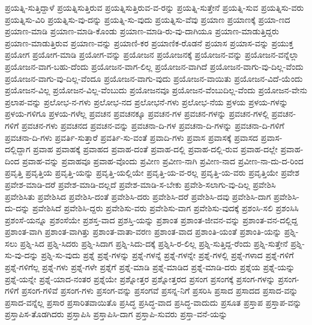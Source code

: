 {ಪ್ರಯತ್ನಿ-ಸುತ್ತಿದ್ದಾಳೆ
ಪ್ರಯತ್ನಿಸುತ್ತಿರುವ
ಪ್ರಯತ್ನಿಸುತ್ತಿರುವ-ವ-ರನ್ನು
ಪ್ರಯತ್ನಿ-ಸುತ್ತೇನೆ
ಪ್ರಯತ್ನಿ-ಸುವ
ಪ್ರಯತ್ನಿಸು-ವರು
ಪ್ರಯತ್ನಿಸು-ವಿರಿ
ಪ್ರಯತ್ನಿಸು-ವು-ದನ್ನು
ಪ್ರಯತ್ನಿ-ಸು-ವುದು
ಪ್ರಯತ್ನಿಸು-ವೆವು
ಪ್ರಯಾಣ
ಪ್ರಯಾಣಕ್ಕೆ
ಪ್ರಯಾ-ಣದ
ಪ್ರಯಾಣ-ಮಾಡಿ
ಪ್ರಯಾಣ-ಮಾಡಿ-ಕೊಂಡು
ಪ್ರಯಾಣ-ಮಾಡಿ-ರು-ವು-ದಾಗಿಯೂ
ಪ್ರಯಾಣ-ಮಾಡುತ್ತಿದ್ದರು
ಪ್ರಯಾಣ-ಮಾಡುತ್ತಿರುವ
ಪ್ರಯಾಣ-ವನ್ನು
ಪ್ರಯಾಣಿ-ಕರ
ಪ್ರಯಾಣಿಕ-ರೊಡನೆ
ಪ್ರಯಾಸ
ಪ್ರಯಾಸ-ವನ್ನು
ಪ್ರಯುಕ್ತ
ಪ್ರಯೋಗ
ಪ್ರಯೋಗ-ಮಾಡಿ
ಪ್ರಯೋಗ-ವನ್ನು
ಪ್ರಯೋಜನ
ಪ್ರಯೋಜನಕ್ಕೆ
ಪ್ರಯೋಜನ-ವನ್ನು
ಪ್ರಯೋಜನ-ವನ್ನೆಲ್ಲಾ
ಪ್ರಯೋಜನ-ವಾಗ-ಬಹು-ದೆಂದು
ಪ್ರಯೋಜನ-ವಾಗ-ಲಿಲ್ಲ
ಪ್ರಯೋಜನ-ವಾಗಿದೆ
ಪ್ರಯೋಜನ-ವಾಗು-ವು-ದಿಲ್ಲ-ವೆಂದು
ಪ್ರಯೋಜನ-ವಾಗು-ವು-ದಿಲ್ಲ-ವೆಂದೂ
ಪ್ರಯೋಜನ-ವಾಗು-ವುದು
ಪ್ರಯೋಜನ-ವಾಯಿತು
ಪ್ರಯೋಜನ-ವಿದೆ-ಯೆಂದು
ಪ್ರಯೋಜನ-ವಿಲ್ಲ
ಪ್ರಯೋಜನ-ವಿಲ್ಲ-ವೆಂಬುದು
ಪ್ರಯೋಜನವೂ
ಪ್ರಯೋಜನ-ವೆಂಬುದಿಲ್ಲ-ವೆಂದು
ಪ್ರಯೋಜನ-ವೇನು
ಪ್ರಲಾಪ-ವನ್ನು
ಪ್ರಲೋಭ-ನ-ಗಳು
ಪ್ರಲೋಭ-ನದ
ಪ್ರಲೋಭನೆ-ಗಳು
ಪ್ರಲೋಭ-ನೆಯ
ಪ್ರಳಯ
ಪ್ರಳಯ-ಗಳನ್ನು
ಪ್ರಳಯ-ಗಳಿಗೂ
ಪ್ರಳಯ-ಗಳೆಲ್ಲ
ಪ್ರವಚನ
ಪ್ರವಚನಕ್ಕೂ
ಪ್ರವಚನ-ಗಳ
ಪ್ರವಚನ-ಗಳನ್ನು
ಪ್ರವಚನ-ಗಳಲ್ಲಿ
ಪ್ರವಚನ-ಗಳಿಗೆ
ಪ್ರವಚನ-ಗಳು
ಪ್ರವಚನದ
ಪ್ರವಚನ-ವನ್ನು
ಪ್ರವಚನಾ-ದಿ-ಗಳ
ಪ್ರವಚನಾ-ದಿ-ಗಳನ್ನು
ಪ್ರವಚನಾ-ದಿ-ಗಳಿಗೆ
ಪ್ರವಚನಾ-ದಿ-ಗಳು
ಪ್ರವರ್ತಿ-ಸುತ್ತಾರೆ
ಪ್ರವರ್ತಿ-ಸು-ವಂತೆ
ಪ್ರವಾದಿ-ಗಳು
ಪ್ರವಾಸ
ಪ್ರವಾಸಕ್ಕೆ
ಪ್ರವಾಸದ
ಪ್ರವಾಸ-ದಲ್ಲಿದ್ದಾಗ
ಪ್ರವಾಹ
ಪ್ರವಾಹಕ್ಕೆ
ಪ್ರವಾಹದ
ಪ್ರವಾಹ-ದಂತೆ
ಪ್ರವಾಹ-ದಲ್ಲಿ
ಪ್ರವಾಹ-ದಲ್ಲಿ-ರುವ
ಪ್ರವಾಹ-ದಲ್ಲೇ
ಪ್ರವಾಹ-ದಿಂದ
ಪ್ರವಾಹ-ವನ್ನು
ಪ್ರವಾಹವೂ
ಪ್ರವಾಹ-ವೊಂದು
ಪ್ರವೀಣ
ಪ್ರವೀಣ-ನಾಗಿ
ಪ್ರವೀಣ-ನಾದ
ಪ್ರವೀಣ-ನಾ-ದು-ದ-ರಿಂದ
ಪ್ರವೃತ್ತಿ
ಪ್ರವೃತ್ತಿಯ
ಪ್ರವೃತ್ತಿ-ಯನ್ನು
ಪ್ರವೃತ್ತಿ-ಯಲ್ಲಿಯೇ
ಪ್ರವೃತ್ತಿ-ಯ-ವ-ರಲ್ಲ
ಪ್ರವೃತ್ತಿ-ಯ-ವರು
ಪ್ರವೃತ್ತಿಯೇ
ಪ್ರವೇಶ
ಪ್ರವೇಶ-ಮಾಡಿ-ದರೆ
ಪ್ರವೇಶ-ಮಾಡಿ-ದಲ್ಲದೆ
ಪ್ರವೇಶ-ಮಾಡಿ-ಸ-ಬೇಕು
ಪ್ರವೇಶಿ-ಸಲಾಗು-ವು-ದಿಲ್ಲ
ಪ್ರವೇಶಿಸಿ
ಪ್ರವೇಶಿಸಿತು
ಪ್ರವೇಶಿಸಿದ
ಪ್ರವೇಶಿಸಿ-ದಂತೆ
ಪ್ರವೇಶಿಸಿ-ದರು
ಪ್ರವೇಶಿಸಿ-ದರೆ
ಪ್ರವೇಶಿಸಿ-ದವು
ಪ್ರವೇಶಿಸಿ-ದಾಗ
ಪ್ರವೇಶಿಸಿ-ದು-ದನ್ನು
ಪ್ರವೇಶಿಸಿದೆ
ಪ್ರವೇಶಿಸಿ-ದ್ದರು
ಪ್ರವೇಶಿಸು-ವರು
ಪ್ರವೇಶಿಸು-ವಾಗ
ಪ್ರವೇಶಿಸು-ವುದಕ್ಕೆ
ಪ್ರಶಂಸಿ-ಸಲಿ
ಪ್ರಶಂಸಿಸಿ
ಪ್ರಶಂಸೆ-ಯನ್ನೂ
ಪ್ರಶಂಸೆಯೇ
ಪ್ರಶಸ್ತ-ವಾದ
ಪ್ರಶಸ್ತಿ-ಯನ್ನು
ಪ್ರಶಾಂತ
ಪ್ರಶಾಂತ-ಜೀವನ-ವನ್ನು
ಪ್ರಶಾಂತ-ವನ-ದಲ್ಲಿದ್ದ
ಪ್ರಶಾಂತ-ವಾಗಿ
ಪ್ರಶಾಂತ-ವಾಗಿತ್ತು
ಪ್ರಶಾಂತ-ವಾತಾ-ವರಣ
ಪ್ರಶಾಂತ-ವಾದ
ಪ್ರಶಾಂತಿ-ಯಂತೆ
ಪ್ರಶಾಂತಿ-ಯನ್ನು
ಪ್ರಶ್ನಿ-ಸಲು
ಪ್ರಶ್ನಿ-ಸಿದ
ಪ್ರಶ್ನಿ-ಸಿದರು
ಪ್ರಶ್ನಿ-ಸಿದಾಗ
ಪ್ರಶ್ನಿ-ಸಿದು-ದಕ್ಕೆ
ಪ್ರಶ್ನಿಸಿ-ರ-ಲಿಲ್ಲ
ಪ್ರಶ್ನಿ-ಸುತ್ತಿದ್ದ-ರೆಂದು
ಪ್ರಶ್ನಿ-ಸುತ್ತೇನೆ
ಪ್ರಶ್ನಿ-ಸು-ವು-ದನ್ನು
ಪ್ರಶ್ನಿ-ಸು-ವುದು
ಪ್ರಶ್ನೆ
ಪ್ರಶ್ನೆ-ಗಳನ್ನು
ಪ್ರಶ್ನೆ-ಗಳನ್ನೆ
ಪ್ರಶ್ನೆ-ಗಳನ್ನೇ
ಪ್ರಶ್ನೆ-ಗಳಲ್ಲಿ
ಪ್ರಶ್ನೆ-ಗಳಾದ
ಪ್ರಶ್ನೆ-ಗಳಿಗೆ
ಪ್ರಶ್ನೆ-ಗಳಿಗೆಲ್ಲ
ಪ್ರಶ್ನೆ-ಗಳು
ಪ್ರಶ್ನೆ-ಗಳೇ
ಪ್ರಶ್ನೆಗೆ
ಪ್ರಶ್ನೆ-ಮಾಡಿ
ಪ್ರಶ್ನೆ-ಮಾಡಿದ
ಪ್ರಶ್ನೆ-ಮಾಡಿ-ದರು
ಪ್ರಶ್ನೆಯ
ಪ್ರಶ್ನೆ-ಯನ್ನು
ಪ್ರಶ್ನೆ-ಯನ್ನೇ
ಪ್ರಶ್ನೆ-ಯಾದ-ನಂತರ
ಪ್ರಶ್ನೆಯೇ
ಪ್ರಶ್ನೋತ್ತರ
ಪ್ರಶ್ನೋತ್ತರದ
ಪ್ರಸಂಗ
ಪ್ರಸಂಗಕ್ಕೆ
ಪ್ರಸಂಗ-ಗಳನ್ನು
ಪ್ರಸಂಗ-ಗಳಿಗೆ
ಪ್ರಸಂಗ-ಗಳಿವೆ
ಪ್ರಸಂಗ-ಗಳು
ಪ್ರಸಂಗ-ವನ್ನು
ಪ್ರಸಂಗವೆ
ಪ್ರಸನ್ನ-ನಿಗೆ
ಪ್ರಸರಿಸಿ
ಪ್ರಸಾದ
ಪ್ರಸಾದದ
ಪ್ರಸಾದ-ವನ್ನು
ಪ್ರಸಾದ-ವನ್ನೆಲ್ಲ
ಪ್ರಸಾರ
ಪ್ರಸಾರಿತವಾಯಿತೊ
ಪ್ರಸಿದ್ಧ
ಪ್ರಸಿದ್ಧ-ವಾದ
ಪ್ರಸಿದ್ಧ-ವಾದುದು
ಪ್ರಸೂತ
ಪ್ರಸ್ತಾಪ
ಪ್ರಸ್ತಾಪ-ವನ್ನು
ಪ್ರಸ್ತಾಪಿಸ-ತೊಡಗಿದರು
ಪ್ರಸ್ತಾಪಿಸಿ
ಪ್ರಸ್ತಾಪಿಸಿ-ದಾಗ
ಪ್ರಸ್ತಾಪಿ-ಸುವರು
ಪ್ರಸ್ತಾ-ವನೆ-ಯನ್ನು
}
